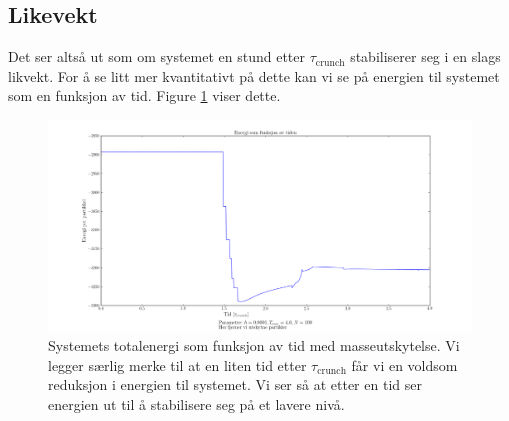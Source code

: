 \documentclass[11pt]{article}
\begin{document}
\begin{multicols}{2}



\subsection{Likevekt}
Det ser altså ut som om systemet en stund etter $\tau_\text{crunch}$
stabiliserer seg i en slags likvekt. For å se litt mer kvantitativt på
dette kan vi se på energien til systemet som en funksjon av tid. Figure
\ref{fig:energi-vs-tid-med-utskytning} viser dette. 

\end{multicols}
\begin{figure}[ht!]
  \centering
  \includegraphics[width=\textwidth]{../fig/energy_plot_with_ejection.png}
  \caption{\label{fig:energi-vs-tid-med-utskytning} Systemets
    totalenergi som funksjon av tid med masseutskytelse. Vi legger
    særlig merke til at en liten tid etter $\tau_\text{crunch}$ får vi
  en voldsom reduksjon i energien til systemet. Vi ser så at etter en
  tid ser energien ut til å stabilisere seg på et lavere nivå.}
\end{figure}
\end{document}
